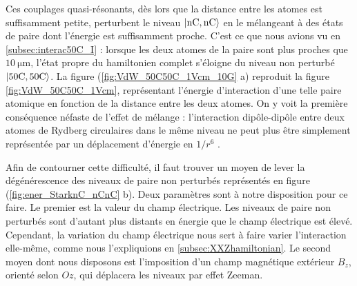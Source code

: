 Ces couplages quasi-résonants, dès lors que la distance entre les atomes est suffisamment petite, perturbent le niveau $\ket{\mathrm{nC,nC}}$ en le mélangeant à des états de paire dont l'énergie est suffisamment proche.
C'est ce que nous avions vu en \ref{subsec:interac50C_I} : lorsque les deux atomes de la paire sont plus proches que $\SI{10}{\um}$, l'état propre du hamiltonien complet s'éloigne du niveau non perturbé $\ket{\mathrm{50C,50C}}$.
La figure (\ref{fig:VdW_50C50C_1Vcm_10G} a) reproduit la figure \eqref{fig:VdW_50C50C_1Vcm}, représentant l'énergie d'interaction d'une telle paire atomique en fonction de la distance entre les deux atomes.
On y voit la première conséquence néfaste de l'effet de mélange : l'interaction dipôle-dipôle entre deux atomes de Rydberg circulaires dans le même niveau ne peut plus être simplement représentée par un déplacement d'énergie en $1/r^6$ .

Afin de contourner cette difficulté, il faut trouver un moyen de lever la dégénérescence des niveaux de paire non perturbés représentés en figure (\ref{fig:ener_StarknC_nCnC} b).
Deux paramètres sont à notre disposition pour ce faire.
Le premier est la valeur du champ électrique.
Les niveaux de paire non perturbés sont d'autant plus distants en énergie que le champ électrique est élevé.
Cependant, la variation du champ électrique nous sert à faire varier l'interaction elle-même, comme nous l'expliquions en \ref{subsec:XXZhamiltonian}.
Le second moyen dont nous disposons est l'imposition d'un champ magnétique extérieur $B_z$, orienté selon $Oz$, qui déplacera les niveaux par effet Zeeman.

